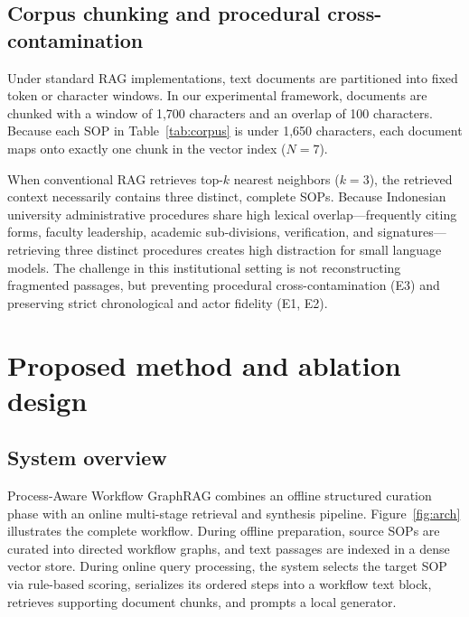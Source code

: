 \documentclass[preprint,10pt]{elsarticle}
\begin{document}
\subsection{Corpus chunking and procedural cross-contamination}
Under standard RAG implementations, text documents are partitioned into fixed token or character windows. In our experimental framework, documents are chunked with a window of 1,700 characters and an overlap of 100 characters. Because each SOP in Table~\ref{tab:corpus} is under 1,650 characters, each document maps onto exactly one chunk in the vector index ($N = 7$).

When conventional RAG retrieves top-$k$ nearest neighbors ($k=3$), the retrieved context necessarily contains three distinct, complete SOPs. Because Indonesian university administrative procedures share high lexical overlap---frequently citing forms, faculty leadership, academic sub-divisions, verification, and signatures---retrieving three distinct procedures creates high distraction for small language models. The challenge in this institutional setting is not reconstructing fragmented passages, but preventing procedural cross-contamination (E3) and preserving strict chronological and actor fidelity (E1, E2).

\section{Proposed method and ablation design}
\label{sec:method}

\subsection{System overview}
Process-Aware Workflow GraphRAG combines an offline structured curation phase with an online multi-stage retrieval and synthesis pipeline. Figure~\ref{fig:arch} illustrates the complete workflow. During offline preparation, source SOPs are curated into directed workflow graphs, and text passages are indexed in a dense vector store. During online query processing, the system selects the target SOP via rule-based scoring, serializes its ordered steps into a workflow text block, retrieves supporting document chunks, and prompts a local generator.
\end{document}
